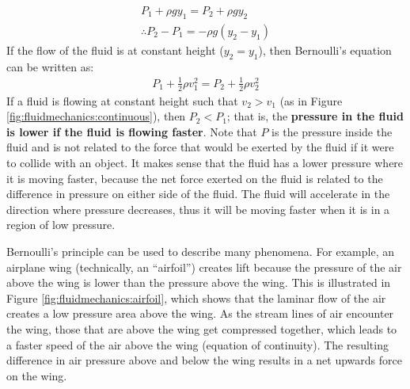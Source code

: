 {{\begin{align*}
P_1 + \rho g y_1= P_2 + \rho g y_2\\
\therefore P_2 - P_1 = - \rho g (y_2 - y_1)
\end{align*}
If the flow of the fluid is at constant height ($y_2=y_1$), then Bernoulli's equation can be written as:
\begin{align*}
P_1 +\frac{1}{2}\rho v_1^2 = P_2 + \frac{1}{2}\rho v_2^2 
\end{align*}
If a fluid is flowing at constant height such that $v_2 > v_1$ (as in Figure \ref{fig:fluidmechanics:continuous}), then $P_2<P_1$; that is, the \textbf{pressure in the fluid is lower if the fluid is flowing faster}. Note that $P$ is the pressure inside the fluid and is not related to the force that would be exerted by the fluid if it were to collide with an object. It makes sense that the fluid has a lower pressure where it is moving faster, because the net force exerted on the fluid is related to the difference in pressure on either side of the fluid. The fluid will accelerate in the direction where pressure decreases, thus it will be moving faster when it is in a region of low pressure.

Bernoulli's principle can be used to describe many phenomena. For example, an airplane wing (technically, an ``airfoil'') creates lift because the pressure of the air above the wing is lower than the pressure above the wing. This is illustrated in Figure \ref{fig:fluidmechanics:airfoil}, which shows that the laminar flow of the air creates a low pressure area above the wing. As the stream lines of air encounter the wing, those that are above the wing get compressed together, which leads to a faster speed of the air above the wing (equation of continuity). The resulting difference in air pressure above and below the wing results in a net upwards force on the wing. 


}}
